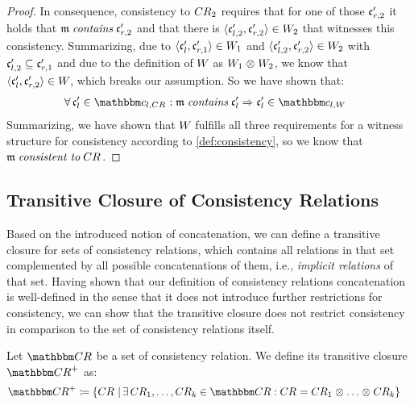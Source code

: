 \begin{proof}
    In consequence, consistency to $\consistencyrelation{CR}{2}$ requires that for one of those $\conditionelement{c}{r,2}'$ it holds that $\modeltuple{m} \containsmath \conditionelement{c}{r,2}'$ and that there is $\tupled{\conditionelement{c}{l,2}', \conditionelement{c}{r,2}'} \in \consistencyrelation{W}{2}$ that witnesses this consistency.
    Summarizing, due to $\tupled{\conditionelement{c}{l}', \conditionelement{c}{r,1}'} \in \consistencyrelation{W}{1}$ and $\tupled{\conditionelement{c}{l,2}', \conditionelement{c}{r,2}'} \in \consistencyrelation{W}{2}$ with $\conditionelement{c}{l,2}' \subseteq \conditionelement{c}{r,1}'$ and due to the definition of $\consistencyrelation{W}{}$ as $\consistencyrelation{W}{1} \concat \consistencyrelation{W}{2}$, we know that $\tupled{\conditionelement{c}{l}', \conditionelement{c}{r,2}'} \in \consistencyrelation{W}{}$, which breaks our assumption.
    So we have shown that:
    \begin{align*}
        &
        \forall \conditionelement{c}{l}' \in \condition{c}{l,\consistencyrelation{CR}{}} : \modeltuple{m} \containsmath \conditionelement{c}{l}' \Rightarrow \conditionelement{c}{l}' \in \condition{c}{l,\consistencyrelation{W}{}}
    \end{align*}
    Summarizing, we have shown that $\consistencyrelation{W}{}$ fulfills all three requirements for a witness structure for consistency according to \autoref{def:consistency}, so we know that $\modeltuple{m} \consistenttomath \consistencyrelation{CR}{}$.
\end{proof}


\subsection{Transitive Closure of Consistency Relations}

Based on the introduced notion of concatenation, we can define a transitive closure for sets of consistency relations, which contains all relations in that set complemented by all possible concatenations of them, i.e., \emph{implicit relations} of that set.
Having shown that our definition of consistency relations concatenation is well-defined in the sense that it does not introduce further restrictions for consistency, we can show that the transitive closure does not restrict consistency in comparison to the set of consistency relations itself.

\begin{definition} \label{def:transitiveclosure}
    Let $\consistencyrelationset{CR}$ be a set of consistency relation. We define its transitive closure $\transitiveclosure{\consistencyrelationset{CR}}$ as:
    \begin{align*}
        \transitiveclosure{\consistencyrelationset{CR}{}} \equalsperdefinition \setted{\consistencyrelation{CR}{} \mid & \exists \consistencyrelation{CR}{1}, \dots, \consistencyrelation{CR}{k} \in \consistencyrelationset{CR}{} :
        \consistencyrelation{CR}{} = \consistencyrelation{CR}{1} \concat \dots \concat \consistencyrelation{CR}{k} }
    \end{align*}
\end{definition}

